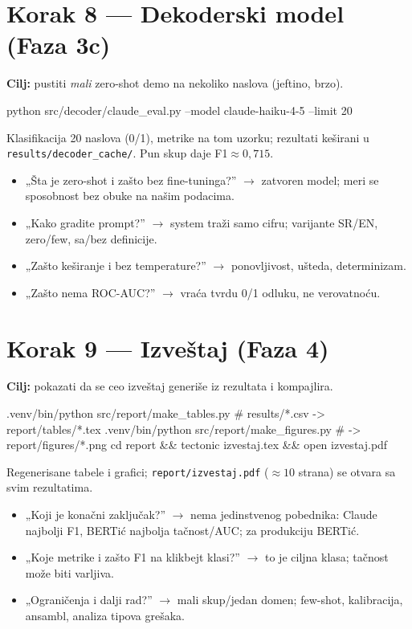 \documentclass[11pt,a4paper]{article}
\newcommand{\kod}[1]{\texttt{#1}}
\begin{document}
\section{Korak 8 --- Dekoderski model (Faza 3c)}
\textbf{Cilj:} pustiti \emph{mali} zero-shot demo na nekoliko naslova (jeftino, brzo).
\begin{cmd}
python src/decoder/claude_eval.py --model claude-haiku-4-5 --limit 20
\end{cmd}
\begin{izlaz}
Klasifikacija 20 naslova (0/1), metrike na tom uzorku; rezultati keširani u
\kod{results/decoder\_cache/}. Pun skup daje F1${\approx}0{,}715$.
\end{izlaz}
\begin{pita}
\begin{itemize}[nosep]
  \item „Šta je zero-shot i zašto bez fine-tuninga?'' $\to$ zatvoren model; meri se
    sposobnost bez obuke na našim podacima.
  \item „Kako gradite prompt?'' $\to$ system traži samo cifru; varijante SR/EN,
    zero/few, sa/bez definicije.
  \item „Zašto keširanje i bez temperature?'' $\to$ ponovljivost, ušteda, determinizam.
  \item „Zašto nema ROC-AUC?'' $\to$ vraća tvrdu 0/1 odluku, ne verovatnoću.
\end{itemize}
\end{pita}

\section{Korak 9 --- Izveštaj (Faza 4)}
\textbf{Cilj:} pokazati da se ceo izveštaj generiše iz rezultata i kompajlira.
\begin{cmd}
.venv/bin/python src/report/make_tables.py     # results/*.csv -> report/tables/*.tex
.venv/bin/python src/report/make_figures.py     # -> report/figures/*.png
cd report && tectonic izvestaj.tex && open izvestaj.pdf
\end{cmd}
\begin{izlaz}
Regenerisane tabele i grafici; \kod{report/izvestaj.pdf} (${\approx}10$ strana) se
otvara sa svim rezultatima.
\end{izlaz}
\begin{pita}
\begin{itemize}[nosep]
  \item „Koji je konačni zaključak?'' $\to$ nema jedinstvenog pobednika: Claude najbolji
    F1, BERTić najbolja tačnost/AUC; za produkciju BERTić.
  \item „Koje metrike i zašto F1 na klikbejt klasi?'' $\to$ to je ciljna klasa; tačnost
    može biti varljiva.
  \item „Ograničenja i dalji rad?'' $\to$ mali skup/jedan domen; few-shot, kalibracija,
    ansambl, analiza tipova grešaka.
\end{itemize}
\end{pita}
\end{document}
